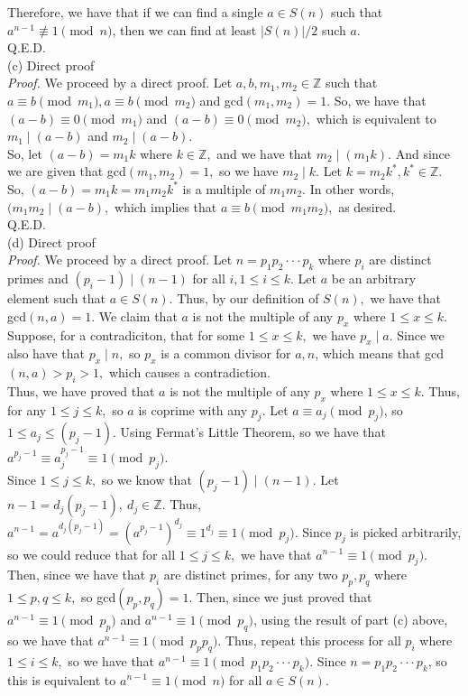 \documentclass{article}
\begin{document}
Therefore, we have that if we can find a single $a\in S(n)$ such that $a^{n-1}\not\equiv1\pmod{n}$, then we can find at least $|S(n)| / 2$ such $a.$ \\[.1cm]
Q.E.D. \\[.5cm]
(c) Direct proof \\[.3cm]
\textit{Proof.} We proceed by a direct proof. Let $a, b, m_1, m_2\in\mathbb{Z}$ such that $a\equiv b\pmod{m_1}, a\equiv b\pmod{m_2}$ and gcd$(m_1, m_2) = 1.$ So, we have that $(a-b)\equiv0\pmod{m_1}$ and $(a-b)\equiv0\pmod{m_2},$ which is equivalent to $m_1\mid(a-b)$ and $m_2\mid(a-b).$ \\[.1cm]
So, let $(a - b) = m_1k$ where $k\in\mathbb{Z},$ and we have that $m_2\mid(m_1k).$ And since we are given that gcd$(m_1, m_2) = 1,$ so we have $m_2\mid k.$ Let $k = m_2k^*, k^*\in\mathbb{Z}.$ So, $(a-b) = m_1k = m_1m_2k^*$ is a multiple of $m_1m_2.$ In other words, $(m_1m_2\mid(a-b),$ which implies that $a\equiv b\pmod{m_1m_2},$ as desired. \\[.1cm]
Q.E.D. \\[.5cm]
(d) Direct proof \\[.3cm]
\textit{Proof.} We proceed by a direct proof. Let $n = p_1p_2\cdot\cdot\cdot p_k$ where $p_i$ are distinct primes and $(p_i-1)\mid(n-1)$ for all $i, 1\leq i\leq k.$ Let $a$ be an arbitrary element such that $a\in S(n).$ Thus, by our definition of $S(n),$ we have that gcd$(n, a) = 1.$ We claim that $a$ is not the multiple of any $p_x$ where $1\leq x\leq k.$ \\[.1cm]
\indent Suppose, for a contradiciton, that for some $1\leq x\leq k,$ we have $p_x\mid a.$ Since we also have that $p_x\mid n,$ so $p_x$ is a common divisor for $a, n$, which means that gcd$(n, a) > p_i > 1,$ which causes a contradiction. \\[.1cm]
Thus, we have proved that $a$ is not the multiple of any $p_x$ where $1\leq x\leq k.$ Thus, for any $1\leq j\leq k,$ so $a$ is coprime with any $p_j.$ Let $a\equiv a_j\pmod{p_j}$, so $1\leq a_j\leq(p_j - 1).$ Using Fermat's Little Theorem, so we have that $a^{p_j - 1}\equiv a_j^{p_j - 1}\equiv1\pmod{p_j}.$ \\[.1cm]
Since $1\leq j\leq k,$ so we know that $(p_j-1)\mid(n-1).$ Let $n - 1 = d_j(p_j - 1),\ d_j\in\mathbb{Z}$. Thus, $a^{n-1} = a^{d_j(p_j - 1)} = (a^{p_j - 1})^{d_j}\equiv1^{d_j}\equiv1\pmod{p_j}.$ Since $p_j$ is picked arbitrarily, so we could reduce that for all $1\leq j\leq k,$ we have that $a^{n-1}\equiv1\pmod{p_j}.$ Then, since we have that $p_i$ are distinct primes, for any two $p_p, p_q$ where $1\leq p,q\leq k,$ so gcd$(p_p, p_q) = 1.$ Then, since we just proved that $a^{n-1}\equiv1\pmod{p_p}$ and $a^{n-1}\equiv1\pmod{p_q}$, using the result of part (c) above, so we have that $a^{n-1}\equiv1\pmod{p_pp_q}.$ Thus, repeat this process for all $p_i$ where $1\leq i\leq k,$ so we have that $a^{n-1}\equiv1\pmod{p_1p_2\cdot\cdot\cdot p_k}.$ Since $n = p_1p_2\cdot\cdot\cdot p_k$, so this is equivalent to $a^{n-1}\equiv1\pmod{n}$ for all $a\in S(n)$. \\[.1cm]
\end{document}
